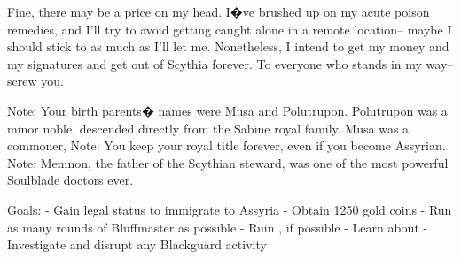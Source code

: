 \documentclass[char]{Kos}
\begin{document}
Fine, there may be a price on my head. I�ve brushed up on my acute poison remedies, and I'll try to avoid getting caught alone in a remote location-- maybe I should stick to \cPoet{\nickname} as much as \cPoet{\they}I'll let me. Nonetheless, I intend to get my money and my signatures and get out of Scythia forever. To everyone who stands in my way-- screw you.


Note: Your birth parents� names were Musa and Polutrupon. Polutrupon was a minor noble, descended directly from the Sabine royal family. Musa was a commoner, 
Note: You keep your royal title forever, even if you become Assyrian.
Note: Memnon, the father of the Scythian steward, was one of the most powerful Soulblade doctors ever.

Goals:
- Gain legal status to immigrate to Assyria
- Obtain 1250 gold coins
- Run as many rounds of Bluffmaster as possible
- Ruin \cBride{\nickname}, if possible
- Learn about \cAnarchist{\nickname}
- Investigate and disrupt any Blackguard activity
\end{document}
